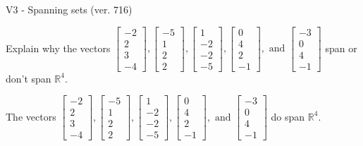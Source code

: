 \begin{exercise}
  \begin{exerciseTitle}V3 - Spanning sets (ver. 716)\end{exerciseTitle}
  \begin{exerciseStatement}
    Explain why the vectors \(\left[\begin{array}{r}
-2 \\
2 \\
3 \\
-4
\end{array}\right] , \left[\begin{array}{r}
-5 \\
1 \\
2 \\
2
\end{array}\right] , \left[\begin{array}{r}
1 \\
-2 \\
-2 \\
-5
\end{array}\right] , \left[\begin{array}{r}
0 \\
4 \\
2 \\
-1
\end{array}\right] , \text{ and } \left[\begin{array}{r}
-3 \\
0 \\
4 \\
-1
\end{array}\right]\) span or don't span \(\mathbb{R}^4\). 
	


  \end{exerciseStatement}
  \begin{exerciseAnswer}
   The vectors \(\left[\begin{array}{r}
-2 \\
2 \\
3 \\
-4
\end{array}\right] , \left[\begin{array}{r}
-5 \\
1 \\
2 \\
2
\end{array}\right] , \left[\begin{array}{r}
1 \\
-2 \\
-2 \\
-5
\end{array}\right] , \left[\begin{array}{r}
0 \\
4 \\
2 \\
-1
\end{array}\right] , \text{ and } \left[\begin{array}{r}
-3 \\
0 \\
4 \\
-1
\end{array}\right]\) 
  	 do  
	span \(\mathbb{R}^4\).
  



\end{exerciseAnswer}
\end{exercise}
